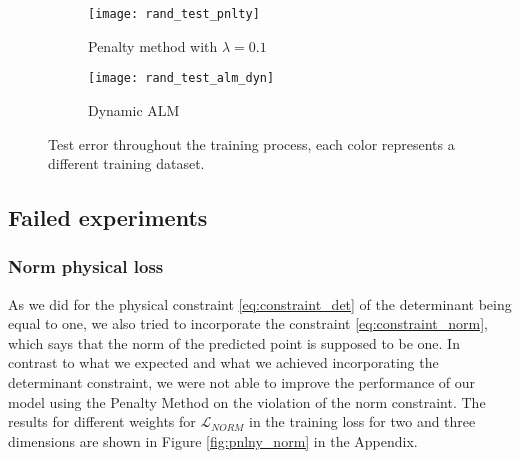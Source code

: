 \begin{figure}
	\centering
	\begin{subfigure}{.5\textwidth}
		\centering
		\texttt{[image: rand\_test\_pnlty]}
		\caption{Penalty method with $\lambda = 0.1$}
	\end{subfigure}%
	\begin{subfigure}{.5\textwidth}
		\centering
		\texttt{[image: rand\_test\_alm\_dyn]}
		\caption{Dynamic ALM}
	\end{subfigure}
	\caption{Test error throughout the training process, each color represents a different training dataset.}
	\label{fig:test_training}
\end{figure}






\subsection{Failed experiments}

\subsubsection{Norm physical loss}
As we did for the physical constraint \eqref{eq:constraint_det} of the determinant being equal to one, we also tried to incorporate the constraint \eqref{eq:constraint_norm}, which says that the norm of the predicted point is supposed to be one. In contrast to what we expected and what we achieved incorporating the determinant constraint, we were not able to improve the performance of our model using the Penalty Method on the violation of the norm constraint. The results for different weights for $\mathcal{L}_{NORM}$ in the training loss for two and three dimensions are shown in Figure \ref{fig:pnlny_norm} in the Appendix.

